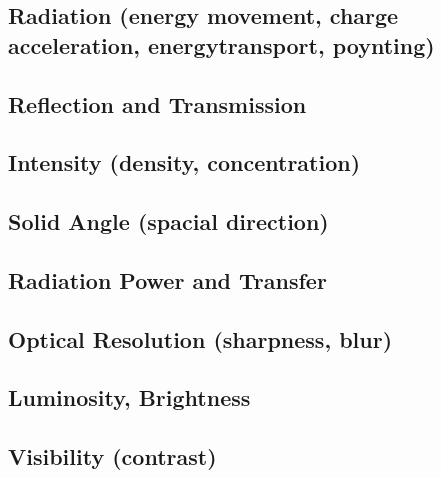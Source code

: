 \subsection{Radiation (energy movement, charge acceleration, energytransport, poynting)} 
 
\vspace{5ex}
\subsection{Reflection and Transmission }
 
 
\vspace{5ex}
\subsection{Intensity (density, concentration)} 
 
\vspace{5ex}
\subsection{Solid Angle (spacial direction)} 
 
\vspace{5ex}
\subsection{Radiation Power and Transfer} 
 
\vspace{5ex}
\subsection{Optical Resolution (sharpness, blur)}
 
\vspace{5ex}
\subsection{Luminosity, Brightness} 
 
\vspace{5ex}
\subsection{Visibility (contrast)}

\vspace{5ex}

